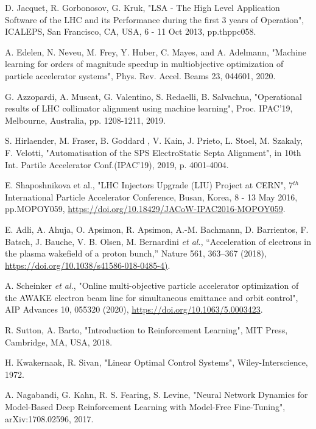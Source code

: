 \documentclass[
 reprint,
 amsmath,amssymb,amsfonts,clevref,
 aps,
prstab,
]{revtex4-2}
\begin{document}
\begin{thebibliography}{9}

 D. Jacquet, R. Gorbonosov, G. Kruk, "LSA - The High Level Application Software of the LHC and its Performance during the first 3 years of Operation", ICALEPS, San Francisco, CA, USA, 6 - 11 Oct 2013, pp.thppc058.

 A. Edelen, N. Neveu, M. Frey, Y. Huber, C. Mayes, and A. Adelmann, "Machine learning for orders of magnitude speedup in multiobjective optimization of particle accelerator systems", Phys. Rev. Accel. Beams 23, 044601, 2020.

 G. Azzopardi, A. Muscat, G. Valentino, S. Redaelli, B. Salvachua, "Operational results of LHC collimator alignment using machine learning", Proc. IPAC'19, Melbourne, Australia, pp. 1208-1211, 2019.

 S. Hirlaender, M. Fraser, B. Goddard , V. Kain, J. Prieto, L. Stoel, M. Szakaly, F. Velotti, "Automatisation of the SPS ElectroStatic Septa Alignment",  
in 10th Int. Partile Accelerator Conf.(IPAC'19), 2019, p. 4001-4004.

 E. Shaposhnikova et al., "LHC Injectors Upgrade (LIU) Project at CERN", 7$^{th}$ International Particle Accelerator Conference, Busan, Korea, 8 - 13 May 2016, pp.MOPOY059, \url{https://doi.org/10.18429/JACoW-IPAC2016-MOPOY059}.

 E. Adli, A. Ahuja, O. Apsimon, R. Apsimon, A.-M. Bachmann, D. Barrientos, F. Batsch, J. Bauche, V. B. Olsen, M. Bernardini \textit{et al.}, “Acceleration of electrons in the plasma wakefield of a proton bunch,” Nature 561, 363–367 (2018), \url{https://doi.org/10.1038/s41586-018-0485-4)}.

 A. Scheinker \textit{et al.}, "Online multi-objective particle accelerator optimization of the AWAKE electron beam line for simultaneous emittance and orbit control", AIP Advances 10, 055320 (2020), \url{https://doi.org/10.1063/5.0003423}.

 R. Sutton, A. Barto, "Introduction to Reinforcement Learning",  MIT Press, Cambridge, MA, USA, 2018.

 H. Kwakernaak, R. Sivan, "Linear Optimal Control Systems", Wiley-Interscience, 1972.

 A. Nagabandi, G. Kahn, R. S. Fearing, S. Levine, "Neural Network Dynamics for Model-Based Deep Reinforcement Learning with Model-Free Fine-Tuning", arXiv:1708.02596, 2017. 


\end{thebibliography}
\end{document}
